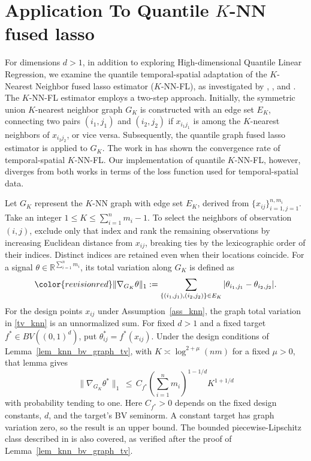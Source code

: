 \documentclass[twoside,11pt]{article}
\newcommand{\rev}[1]{{\color{revisionred}#1}}
\newenvironment{revision}{\color{revisionred}}{}
\begin{document}
\section{Application To Quantile \( K \)-NN fused lasso}


For dimensions \(d > 1\), in addition to exploring High-dimensional Quantile Linear Regression, we examine the quantile temporal-spatial adaptation of the \(K\)-Nearest Neighbor fused lasso estimator (\(K\)-NN-FL), as investigated by \cite{elmoataz2008nonlocal}, \cite{ferradans2014regularized}, and \cite{madrid2020adaptive}. The \(K\)-NN-FL estimator employs a two-step approach. Initially, \rev{the symmetric union \(K\)-nearest neighbor graph} \(G_K\) is constructed with an edge set \(E_K\), connecting two pairs \((i_1, j_1)\) and \((i_2, j_2)\) if \(x_{i_1j_1}\) is among the \(K\)-nearest neighbors of \(x_{i_2j_2}\), \rev{or} vice versa. Subsequently, the quantile graph fused lasso estimator is applied to \(G_K\).
\rev{The work in \cite{padilla2023temporal} has shown the convergence rate of temporal-spatial \(K\)-NN-FL.} Our implementation of quantile \(K\)-NN-FL, however, diverges from both works in terms of the loss function used for temporal-spatial data.

Let \(G_K\) represent the \(K\)-NN graph with edge set \(E_K\),
derived from \(\{x_{ij}\}_{i=1, j=1}^{n,m_i}\).
\rev{Take an integer \(1\le K\le\sum_{i=1}^n m_i-1\). To select
the neighbors of observation \((i,j)\), exclude only that index
and rank the remaining observations by increasing Euclidean
distance from \(x_{ij}\), breaking ties by the lexicographic order
of their indices. Distinct indices are retained even when their
locations coincide.}
For a signal \(\theta \in \mathbb{R}^{\sum_{i=1}^n m_i}\),
its total variation along \(G_K\) is defined as
\begin{equation}
\label{tv_knn}
\rev{\|\nabla_{G_K} \theta\|_1} := \sum_{\{(i_1,j_1),(i_2,j_2)\} \in E_K} |\theta_{i_1,j_1} - \theta_{i_2,j_2}|.
\end{equation}
\begin{revision}
For \rev{the design points \(x_{ij}\)} \rev{under Assumption~\ref{ass_knn}}, the graph total variation in \eqref{tv_knn} is an unnormalized sum. For fixed $d>1$ and a fixed target $f^*\in BV((0,1)^d)$, put $\theta^*_{ij}=f^*(x_{ij})$. Under the design conditions of Lemma~\ref{lem_knn_bv_graph_tv}, with $K\asymp\log^{2+\mu}(nm)$ for a fixed $\mu>0$, that lemma gives
\begin{equation}
\label{l1_norm_for_knn_reg}
\|\nabla_{G_K}\theta^*\|_1
\,\leq\,C_{f^*}\left(\sum_{i=1}^n m_i\right)^{1-1/d}K^{1+1/d}
\end{equation}
with probability tending to one. Here $C_{f^*}>0$ depends on the fixed design constants, $d$, and the target's BV seminorm. A constant target has graph variation zero, so the result is an upper bound. The bounded piecewise-Lipschitz class described in \cite{madrid2020adaptive} is also covered, as verified after the proof of Lemma~\ref{lem_knn_bv_graph_tv}.
\end{revision}
\end{document}

